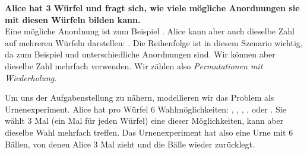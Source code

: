 \documentclass[../../main.tex]{subfiles}
\begin{document}
    
    \begin{example}{}
        \textbf{Alice hat 3 Würfel und fragt sich, wie viele mögliche Anordnungen sie mit diesen Würfeln bilden kann.}\\
        Eine mögliche Anordnung ist zum Beispiel . Alice kann aber auch dieselbe Zahl auf mehreren Würfeln darstellen: . Die Reihenfolge ist in diesem Szenario wichtig, da zum Beispiel  und  unterschiedliche Anordnungen sind. Wir können aber dieselbe Zahl mehrfach verwenden. Wir zählen also \emph{Permutationen mit Wiederholung}.
        
        Um uns der Aufgabenstellung zu nähern, modellieren wir das Problem als Urnenexperiment. Alice hat pro Würfel 6 Wahlmöglichkeiten: , , , ,  oder . Sie wählt 3 Mal (ein Mal für jeden Würfel) eine dieser Möglichkeiten, kann aber dieselbe Wahl mehrfach treffen. Das Urnenexperiment hat also eine Urne mit 6 Bällen, von denen Alice 3 Mal zieht und die Bälle wieder zurücklegt.
        

\end{example}
\end{document}
